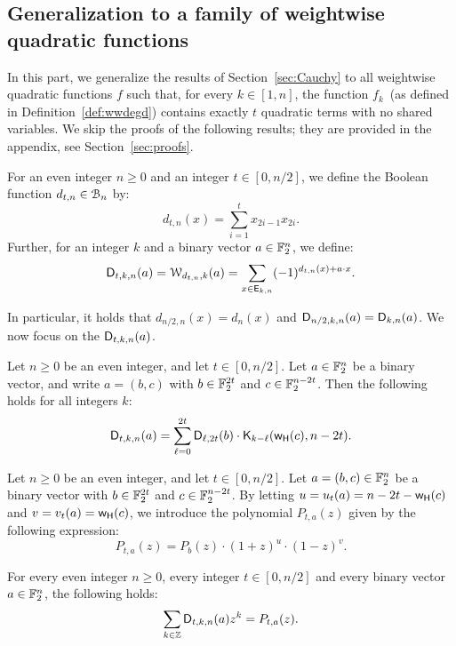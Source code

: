 \documentclass{llncs}
\begin{document}
\subsection{Generalization to a family of weightwise quadratic functions}\label{sec:general}

In this part, we generalize the results of Section~\ref{sec:Cauchy} to all weightwise quadratic functions $f$ such that, for every $k \in [1, n]$, the function $f_k$ (as defined in Definition~\ref{def:wwdegd}) contains exactly $t$ quadratic terms with no shared variables. We skip the proofs of the following results; they are provided in the appendix, see Section~\ref{sec:proofs}.

\begin{definition}
	For an even integer $n\geq 0$ and an integer $t\in[0,n/2]$, we define the Boolean function $d_{t,n}\in\mathcal{B}_n$ by:
	\[
		d_{t,n}(x)=\sum_{i=1}^t x_{2i-1} x_{2i}.
	\]
	Further, for an integer $k$ and a binary vector $a\in\mathbb{F}_2^n$, we define:
	\[
		\mathsf{D}_{t,k,n}(a)=\mathcal{W}_{d_{t,n},k}(a)=\sum_{x\in \mathsf{E}_{k,n}} (-1)^{d_{t,n}(x) +a\cdot x}.
	\]
\end{definition}

In particular, it holds that $d_{n/2,n}(x)=d_n(x)$ and $\mathsf{D}_{n/2,k,n}(a)=\mathsf{D}_{k,n}(a)$. We now focus on the $\mathsf{D}_{t,k,n}(a)$.

\begin{proposition}\label{proposition:dtn}
    Let $n\geq 0$ be an even integer, and let $t\in[0,n/2]$. Let $a\in\mathbb{F}_2^n$ be a binary vector, and write $a=(b,c)$ with $b\in\mathbb{F}_2^{2t}$ and $c\in\mathbb{F}_2^{n-2t}$. Then the following holds for all integers $k$:
	\[
		\mathsf{D}_{t,k,n}(a)=\sum_{\ell=0}^{2t} \mathsf{D}_{\ell,2t}(b)\cdot\mathsf{K}_{k-\ell}(\mathsf{w_H}(c),n-2t).
	\]
\end{proposition}

\begin{definition}\label{defi:P_a_t}
    Let $n\geq 0$ be an even integer, and let $t\in[0,n/2]$. Let $a=(b,c)\in\mathbb{F}_2^n$ be a binary vector with $b\in\mathbb{F}_2^{2t}$ and $c\in\mathbb{F}_2^{n-2t}$. By letting $u=u_t(a)=n-2t-\mathsf{w_H}(c)$ and $v=v_t(a)=\mathsf{w_H}(c)$, we introduce the polynomial $P_{t,a}(z)$ given by the following expression:
    \[
        P_{t,a}(z)=P_b(z)\cdot(1+z)^u\cdot(1-z)^v.
    \]
\end{definition}

\begin{proposition}\label{proposition:sum_dtn}
    For every even integer $n\geq 0$, every integer $t\in[0,n/2]$ and every binary vector $a\in\mathbb{F}_2^n$, the following holds:
    \[
        \sum_{k\in\mathbb{Z}}\mathsf{D}_{t,k,n}(a)z^k=P_{t,a}(z).
    \]
\end{proposition}
\end{document}
